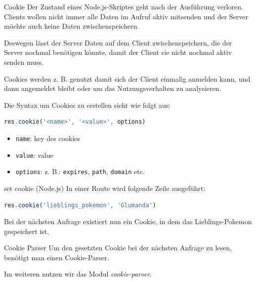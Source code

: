 \begin{defi}{Cookie}
    Der Zustand eines Node.js-Skriptes geht nach der Ausführung verloren.
    Clients wollen nicht immer alle Daten im Aufruf aktiv mitsenden und der Server möchte auch keine Daten zwischenspeichern.

    Deswegen lässt der Server Daten auf dem Client zwischenspeichern, die der Server nochmal benötigen könnte, damit der Client sie nicht nochmal aktiv senden muss.

    Cookies werden z. B. genutzt damit sich der Client einmalig anmelden kann, und dann angemeldet bleibt oder um das Nutzungsverhalten zu analysieren.

    Die Syntax um Cookies zu erstellen sieht wie folgt aus:
    \begin{lstlisting}[language=JavaScript]
        res.cookie('<name>', '<value>', options)
    \end{lstlisting}

    \begin{itemize}
        \item \texttt{name}: key des cookies
        \item \texttt{value}: value
        \item \texttt{options}: z. B.: \texttt{expires}, \texttt{path}, \texttt{domain} etc.
    \end{itemize}
\end{defi}

\begin{example}{set cookie (Node.js)}
    In einer Route wird folgende Zeile ausgeführt:

    \begin{lstlisting}[language=JavaScript]
        res.cookie('lieblings_pokemon', 'Glumanda')
    \end{lstlisting}

    Bei der nächsten Anfrage existiert nun ein Cookie, in dem das Lieblings-Pokemon gespeichert ist.
\end{example}

\begin{bonus}{Cookie Parser}
    Um den gesetzten Cookie bei der nächsten Anfrage zu lesen, benötigt man einen Cookie-Parser.

    Im weiteren nutzen wir das Modul \emph{cookie-parser}.
\end{bonus}

